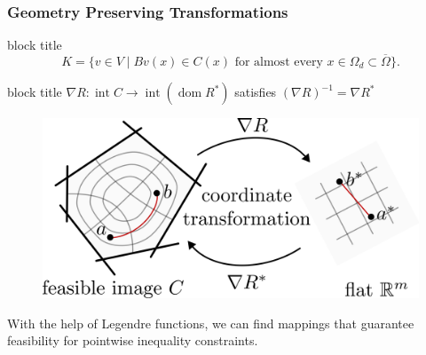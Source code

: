 \documentclass[aspectratio=169,xcolor=dvipsnames,11pt]{beamer}
\begin{document}
\begin{frame}

\end{frame}

\begin{frame}\frametitle{Geometry Preserving Transformations}

\begin{beamercolorbox}[rounded=true, shadow=true, wd=\textwidth]{block title}
\begin{equation*} \label{eq:intro:feasible_set}
K = \{ v \in V \mid Bv(x) \in C(x) \text{ for almost every } x \in \Omega_d \subset \overline{\Omega} \}.
\end{equation*}
\end{beamercolorbox}\hfill

\begin{minipage}{0.5\linewidth}
\begin{beamercolorbox}[rounded=true, shadow=true, wd=\textwidth]{block title}
\centering
 $\nabla R \colon \operatorname{int}C \to \operatorname{int}(\operatorname{dom} R^*)$ satisfies %
 $(\nabla R)^{-1} = \nabla R^\ast$
\end{beamercolorbox}
\end{minipage}
%
\begin{minipage}{0.4\linewidth}
\begin{figure}[h]
\includegraphics[width=0.8\linewidth]{figures/Geodesic3.png} 
\end{figure}
\end{minipage}
\end{frame}


\begin{frame}[plain,c]
\hfill
\begin{center}
\Large With the help of Legendre functions, we can find mappings that \alert{guarantee} feasibility for pointwise inequality constraints.
\end{center}
\hfill
\end{frame}
\end{document}
